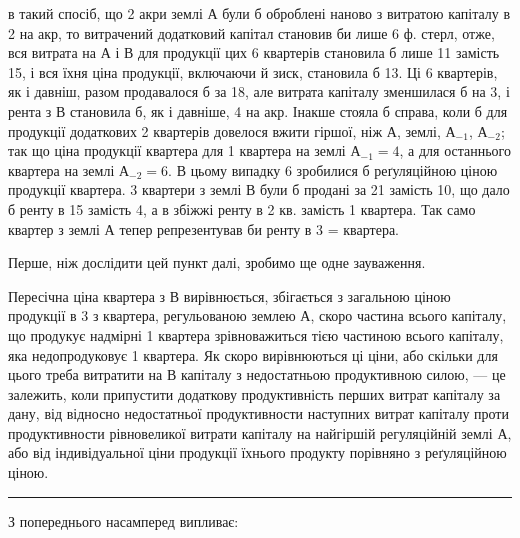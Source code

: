 \parcont{}  %
в такий спосіб, що 2 акри землі $А$ були б оброблені наново з витратою капіталу
в 2 на акр, то витрачений додатковий капітал становив би
лише 6 ф. стерл, отже, вся витрата на $А$ і $В$ для продукції цих 6 квартерів
становила б лише 11 замість 15, і вся їхня ціна
продукції, включаючи й зиск, становила б 13. Ці 6 квартерів, як
і давніш, разом продавалося б за 18, але витрата капіталу зменшилася
б на 3, і рента з $В$ становила б, як і давніше, 4
на акр. Інакше стояла б справа, коли б для продукції додаткових 2 квартерів
довелося вжити гіршої, ніж $А$, землі, $А_{-1}$, $А_{-2}$; так що ціна продукції
квартера для 1 квартера на землі $А_{-1} = 4$, а для останнього
квартера на землі $А_{-2} = 6$. В цьому випадку 6
зробилися б реґуляційною ціною продукції квартера. 3 квартери з землі $В$
були б продані за 21 замість 10, що дало б ренту в 15 замість 4, а в збіжжі ренту в 2 кв. замість 1 квартера.
Так само квартер з землі $А$ тепер репрезентував би ренту в 3 =
 квартера.

Перше, ніж дослідити цей пункт далі, зробимо ще одне зауваження.

Пересічна ціна квартера з $В$ вирівнюється, збігається з загальною ціною
продукції в 3 з квартера, регульованою землею $А$, скоро частина
всього капіталу, що продукує надмірні 1 квартера зрівноважиться тією частиною
всього капіталу, яка недопродуковує 1 квартера. Як скоро вирівнюються
ці ціни, або скільки для цього треба витратити на $В$ капіталу з недостатньою
продуктивною силою, — це залежить, коли припустити додаткову
продуктивність перших витрат капіталу за дану, від відносно недостатньої продуктивности
наступних витрат капіталу проти продуктивности рівновеликої витрати
капіталу на найгіршій регуляційній землі $А$, або від індивідуальної ціни
продукції їхнього продукту порівняно з реґуляційною ціною.

\pfbreak

З попереднього насамперед випливає:

